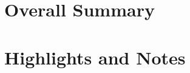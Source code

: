 \documentclass[openany,12pt]{book}
\begin{document}
\newpage
\part{Overall Summary}
















\newpage
\part{Highlights and Notes}
\end{document}
